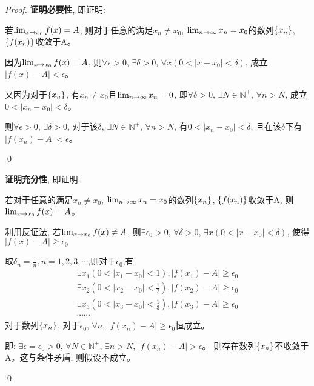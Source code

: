 \begin{proof}
    {\bf 证明必要性}, 即证明: 
    
    若$\lim_{x \to x_0 } f(x) = A$, 则对于任意的满足$x_n \neq x_0$, $\lim_{n \to \infty } x_n = x_0$的数列$\left\{ x_n\right\}$, $\left\{ f(x_n)\right\}$收敛于A。

    因为$\lim_{x \to x_0 } f(x) = A$, 则$\forall \epsilon > 0$, $\exists \delta > 0$, $\forall x ( 0 < \left| x - x_0 \right| < \delta)$, 成立$\left| f(x) - A \right| < \epsilon$。

    又因为对于$\left\{ x_n\right\}$, 有$x_n \neq x_0$且$\lim_{n \to \infty } x_n = 0$, 即$\forall \delta > 0$, $\exists N \in \mathbb{N}^+$, $\forall n > N$, 成立$0 < \left| x_n - x_0 \right| < \delta$。

    则$\forall \epsilon > 0$, $\exists \delta > 0$, 对于该$\delta$, $\exists N \in \mathbb{N}^+$, $\forall n > N$, 有$0 < \left| x_n - x_0 \right| < \delta$, 且在该$\delta$下有$\left| f(x_n) - A \right| < \epsilon$。

    \qed

    {\bf 证明充分性}, 即证明:
    
    若对于任意的满足$x_n \neq x_0$, $\lim_{n \to \infty } x_n = x_0$的数列$\left\{ x_n\right\}$, $\left\{ f(x_n)\right\}$收敛于A, 则$\lim_{x \to x_0 } f(x) = A$。

    利用反证法, 若$\lim_{x \to x_0 } f(x) \neq A$, 则$\exists \epsilon_0 > 0$, $\forall \delta > 0$, $\exists x ( 0 < \left| x - x_0 \right| < \delta)$, 使得$\left| f(x) - A \right| \ge \epsilon_0$

    取$\delta_n = \frac{1}{n}, n = 1, 2, 3, \cdots$,则对于$\epsilon_0$,有:
    \begin{gather*}
        \exists x_1(0 < \left| x_1 -x_0 \right| < 1), \left| f(x_1) - A \right| \ge \epsilon_0 \\
        \exists x_2(0 < \left| x_2 -x_0 \right| < \frac{1}{2}), \left| f(x_2) - A \right| \ge \epsilon_0 \\
        \exists x_3(0 < \left| x_3 -x_0 \right| < \frac{1}{3}), \left| f(x_3) - A \right| \ge \epsilon_0 \\
        \cdots \cdots
    \end{gather*}
    对于数列$\left\{ x_n\right\}$, 对于$\epsilon_0$, $\forall n$, $\left| f(x_n) - A\right| \ge \epsilon_0$恒成立。

    即: $\exists \epsilon = \epsilon_0 > 0$, $\forall N \in \mathbb{N}^+$, $\exists n > N$, $\left| f(x_n) - A\right| > \epsilon$。
    则存在数列$\left\{ x_n\right\}$不收敛于A。这与条件矛盾, 则假设不成立。

    \qed

\end{proof}

